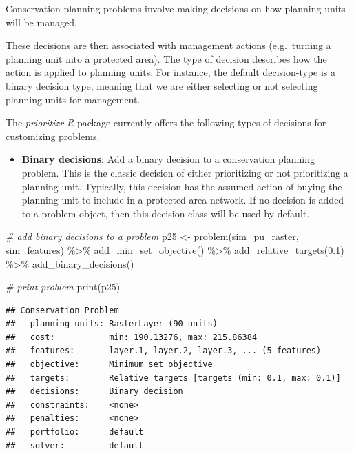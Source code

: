 \documentclass[
  12pt,
]{book}
\newenvironment{Shaded}{\begin{snugshade}}{\end{snugshade}}
\newcommand{\CommentTok}[1]{\textcolor[rgb]{0.56,0.35,0.01}{\textit{#1}}}
\newcommand{\FloatTok}[1]{\textcolor[rgb]{0.00,0.00,0.81}{#1}}
\newcommand{\FunctionTok}[1]{\textcolor[rgb]{0.00,0.00,0.00}{#1}}
\newcommand{\NormalTok}[1]{#1}
\newcommand{\OtherTok}[1]{\textcolor[rgb]{0.56,0.35,0.01}{#1}}
\newcommand{\SpecialCharTok}[1]{\textcolor[rgb]{0.00,0.00,0.00}{#1}}
\providecommand{\tightlist}{%
  \setlength{\itemsep}{0pt}\setlength{\parskip}{0pt}}
\begin{document}
Conservation planning problems involve making decisions on how planning units will be managed.

These decisions are then associated with management actions (e.g.~turning a planning unit into a protected area). The type of decision describes how the action is applied to planning units. For instance, the default decision-type is a binary decision type, meaning that we are either selecting or not selecting planning units for management.

The \emph{prioritizr R} package currently offers the following types of decisions for customizing problems.

\begin{itemize}
\tightlist
\item
  \textbf{Binary decisions}: Add a binary decision to a conservation planning problem. This is the classic decision of either prioritizing or not prioritizing a planning unit. Typically, this decision has the assumed action of buying the planning unit to include in a protected area network. If no decision is added to a problem object, then this decision class will be used by default.
\end{itemize}

\begin{Shaded}
\begin{Highlighting}[]
\CommentTok{\# add binary decisions to a problem}
\NormalTok{p25 }\OtherTok{\textless{}{-}} \FunctionTok{problem}\NormalTok{(sim\_pu\_raster, sim\_features) }\SpecialCharTok{\%\textgreater{}\%}
       \FunctionTok{add\_min\_set\_objective}\NormalTok{() }\SpecialCharTok{\%\textgreater{}\%}
       \FunctionTok{add\_relative\_targets}\NormalTok{(}\FloatTok{0.1}\NormalTok{) }\SpecialCharTok{\%\textgreater{}\%}
       \FunctionTok{add\_binary\_decisions}\NormalTok{()}

\CommentTok{\# print problem}
\FunctionTok{print}\NormalTok{(p25)}
\end{Highlighting}
\end{Shaded}

\begin{verbatim}
## Conservation Problem
##   planning units: RasterLayer (90 units)
##   cost:           min: 190.13276, max: 215.86384
##   features:       layer.1, layer.2, layer.3, ... (5 features)
##   objective:      Minimum set objective 
##   targets:        Relative targets [targets (min: 0.1, max: 0.1)]
##   decisions:      Binary decision 
##   constraints:    <none>
##   penalties:      <none>
##   portfolio:      default
##   solver:         default
\end{verbatim}
\end{document}
